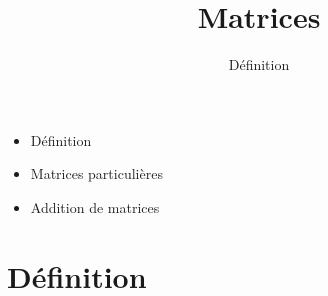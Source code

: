 







\title{{\bf Matrices}}
\subtitle{Définition}

\begin{frame}
  
  \debutmontitre

  \pause

{\footnotesize
\hfill
{}
\begin{minipage}{0.6\textwidth}
  \begin{itemize}
    \item<3-> Définition
    \item<4-> Matrices particulières
    \item<5-> Addition de matrices
  \end{itemize}
\end{minipage}
}

\end{frame}

\setcounter{framenumber}{0}


\section{Définition}

